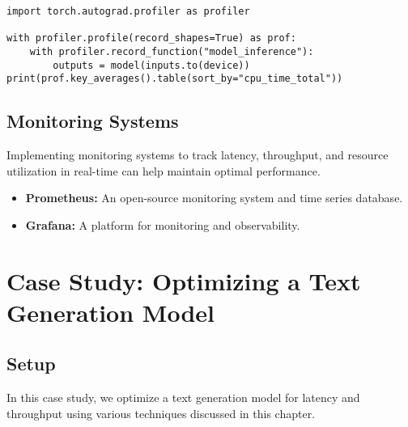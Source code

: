 \begin{verbatim}
import torch.autograd.profiler as profiler

with profiler.profile(record_shapes=True) as prof:
    with profiler.record_function("model_inference"):
        outputs = model(inputs.to(device))
print(prof.key_averages().table(sort_by="cpu_time_total"))
\end{verbatim}

\subsection{Monitoring Systems}
Implementing monitoring systems to track latency, throughput, and resource utilization in real-time can help maintain optimal performance.

\begin{itemize}
    \item \textbf{Prometheus:} An open-source monitoring system and time series database.
    \item \textbf{Grafana:} A platform for monitoring and observability.
\end{itemize}

\section{Case Study: Optimizing a Text Generation Model}

\subsection{Setup}
In this case study, we optimize a text generation model for latency and throughput using various techniques discussed in this chapter.

